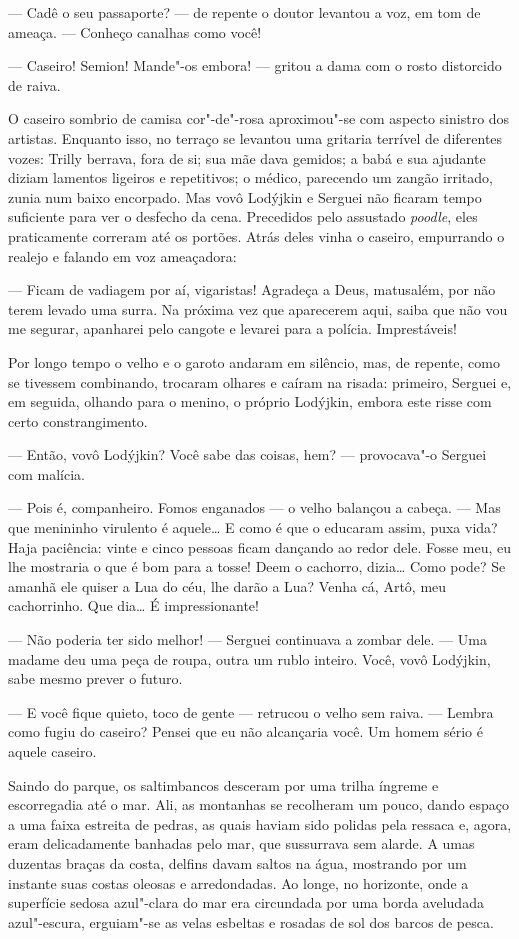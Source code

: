 --- Cadê o seu passaporte? --- de repente o doutor levantou a voz, em
tom de ameaça. --- Conheço canalhas como você!

--- Caseiro! Semion! Mande"-os embora! --- gritou a dama com o rosto
distorcido de raiva.

O caseiro sombrio de camisa cor"-de"-rosa aproximou"-se com aspecto
sinistro dos artistas. Enquanto isso, no terraço se levantou uma
gritaria terrível de diferentes vozes: Trilly berrava, fora de si; sua
mãe dava gemidos; a babá e sua ajudante diziam lamentos ligeiros e
repetitivos; o médico, parecendo um zangão irritado, zunia num baixo
encorpado. Mas vovô Lodýjkin e Serguei não ficaram tempo suficiente para
ver o desfecho da cena. Precedidos pelo assustado \emph{poodle}, eles
praticamente correram até os portões. Atrás deles vinha o caseiro,
empurrando o realejo e falando em voz ameaçadora:

--- Ficam de vadiagem por aí, vigaristas! Agradeça a Deus, matusalém,
por não terem levado uma surra. Na próxima vez que aparecerem aqui,
saiba que não vou me segurar, apanharei pelo cangote e levarei para a
polícia. Imprestáveis!

Por longo tempo o velho e o garoto andaram em silêncio, mas, de
repente, como se tivessem combinando, trocaram olhares e caíram na
risada: primeiro, Serguei e, em seguida, olhando para o menino, o
próprio Lodýjkin, embora este risse com certo constrangimento.

--- Então, vovô Lodýjkin? Você sabe das coisas, hem? --- provocava"-o
Serguei com malícia.

--- Pois é, companheiro. Fomos enganados --- o velho balançou a cabeça.
--- Mas que menininho virulento é aquele\ldots{} E como é que o educaram
assim, puxa vida? Haja paciência: vinte e cinco pessoas ficam dançando
ao redor dele. Fosse meu, eu lhe mostraria o que é bom para a tosse!
Deem o cachorro, dizia\ldots{} Como pode? Se amanhã ele quiser a Lua do céu,
lhe darão a Lua? Venha cá, Artô, meu cachorrinho. Que dia\ldots{} É
impressionante!

--- Não poderia ter sido melhor! --- Serguei continuava a zombar dele.
--- Uma madame deu uma peça de roupa, outra um rublo inteiro. Você, vovô
Lodýjkin, sabe mesmo prever o futuro.

--- E você fique quieto, toco de gente --- retrucou o velho sem raiva.
--- Lembra como fugiu do caseiro? Pensei que eu não alcançaria você. Um
homem sério é aquele caseiro.

Saindo do parque, os saltimbancos desceram por uma trilha íngreme e
escorregadia até o mar. Ali, as montanhas se recolheram um pouco, dando
espaço a uma faixa estreita de pedras, as quais haviam sido polidas pela
ressaca e, agora, eram delicadamente banhadas pelo mar, que sussurrava
sem alarde. A umas duzentas braças da costa, delfins davam saltos na
água, mostrando por um instante suas costas oleosas e arredondadas. Ao
longe, no horizonte, onde a superfície sedosa azul"-clara do mar era
circundada por uma borda aveludada azul"-escura, erguiam"-se as velas
esbeltas e rosadas de sol dos barcos de pesca.

